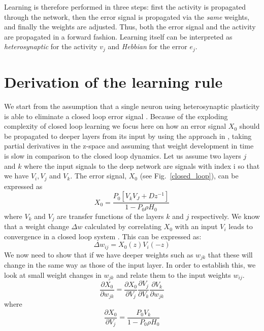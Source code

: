 \documentclass{article}
\begin{document}
Learning is therefore performed in three steps: first the activity is
propagated through the network, then the error signal is propagated
via the \textsl{same} weights, and finally the weights are adjusted. Thus,
both the error signal and the activity are propagated in a forward
fashion. Learning itself can be interpreted as \textsl{heterosynaptic} for the
activity $v_j$ and \textsl{Hebbian} for the error $e_j$.


\section{Derivation of the learning rule}
We start from the assumption that a single neuron using heterosynaptic
plasticity is able to eliminate a closed loop error signal
\cite{Porr2006ICO}. Because of the exploding complexity of closed loop
learning we focus here on how an error signal $X_0$ should be propagated
to deeper layers from its input by using the approach in
\cite{Mehta1986}, taking partial derivatives in the z-space and
assuming that weight development in time is slow in comparison to the
closed loop dynamics.  Let us assume two layers $j$ and $k$ where the
input signals to the deep network are signals with index i so that we
have $V_i, V_j$ and $V_k$. The error signal, $X_0$ (see
Fig.~\ref{closed_loop}), can be expressed as
\begin{equation}
  X_0 = \frac{P_0 \left[ V_k V_J + D z^{-1} \right]}{1-P_0 \rho H_0}
\end{equation}
where $V_k$ and $V_j$ are transfer functions of the layers $k$ and $j$
respectively. We know that a weight change $\Delta w$ calculated by
correlating $X_0$ with an input $V_i$ leads to convergence in a closed
loop system \cite{Porr2006ICO}. This can be expressed as:
\begin{equation}
  \Delta w_{ij} = X_0(z) V_i(-z)
\end{equation}
We now need to show that if we have deeper weights such as $w_{jk}$
that these will change in the same way as those of the input layer. In
order to establish this, we look at small weight changes in $w_{jk}$
and relate them to the input weights $w_{ij}$.
\begin{equation}
    \frac{\partial X_0}{\partial w_{jk}} =
    \frac{\partial X_0}{\partial V_j}
    \frac{\partial V_j}{\partial V_k}
    \frac{\partial V_k}{\partial w_{jk}}
\end{equation}    
where
\begin{equation}
\frac{\partial X_0}{\partial V_j} = \frac{P_0 V_k}{1-P_0 \rho H_0}
\end{equation}
\end{document}
